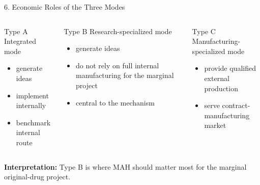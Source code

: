 \documentclass[aspectratio=169,11pt]{beamer}
\begin{document}
\begin{frame}{6. Economic Roles of the Three Modes}
\begin{columns}[T]
\begin{block}{Type A}
Integrated mode
\begin{itemize}
    \item generate ideas
    \item implement internally
    \item benchmark internal route
\end{itemize}
\end{block}

\begin{block}{Type B}
Research-specialized mode
\begin{itemize}
    \item generate ideas
    \item do not rely on full internal manufacturing for the marginal project
    \item central to the mechanism
\end{itemize}
\end{block}

\begin{block}{Type C}
Manufacturing-specialized mode
\begin{itemize}
    \item provide qualified external production
    \item serve contract-manufacturing market
\end{itemize}
\end{block}
\end{columns}

\vspace{0.25cm}
\textbf{Interpretation:} Type B is where MAH should matter most for the marginal original-drug project.
\end{frame}
\end{document}

